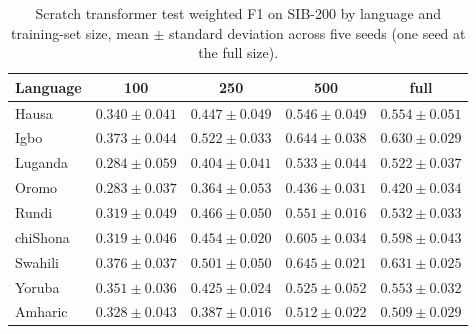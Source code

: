\begin{table}[t]
\centering
\caption{Scratch transformer test weighted F1 on SIB-200 by language and training-set size, mean $\pm$ standard deviation across five seeds (one seed at the full size).}
\label{tab:scratch_main_results}
\small
\begin{tabular}{lcccc}
\toprule
Language & 100 & 250 & 500 & full \\
\midrule
Hausa & $0.340 \pm 0.041$ & $0.447 \pm 0.049$ & $0.546 \pm 0.049$ & $0.554 \pm 0.051$ \\
Igbo & $0.373 \pm 0.044$ & $0.522 \pm 0.033$ & $0.644 \pm 0.038$ & $0.630 \pm 0.029$ \\
Luganda & $0.284 \pm 0.059$ & $0.404 \pm 0.041$ & $0.533 \pm 0.044$ & $0.522 \pm 0.037$ \\
Oromo & $0.283 \pm 0.037$ & $0.364 \pm 0.053$ & $0.436 \pm 0.031$ & $0.420 \pm 0.034$ \\
Rundi & $0.319 \pm 0.049$ & $0.466 \pm 0.050$ & $0.551 \pm 0.016$ & $0.532 \pm 0.033$ \\
chiShona & $0.319 \pm 0.046$ & $0.454 \pm 0.020$ & $0.605 \pm 0.034$ & $0.598 \pm 0.043$ \\
Swahili & $0.376 \pm 0.037$ & $0.501 \pm 0.050$ & $0.645 \pm 0.021$ & $0.631 \pm 0.025$ \\
Yoruba & $0.351 \pm 0.036$ & $0.425 \pm 0.024$ & $0.525 \pm 0.052$ & $0.553 \pm 0.032$ \\
Amharic & $0.328 \pm 0.043$ & $0.387 \pm 0.016$ & $0.512 \pm 0.022$ & $0.509 \pm 0.029$ \\
\bottomrule
\end{tabular}
\end{table}
